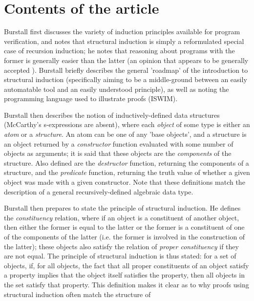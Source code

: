 \documentclass[11pt]{article}
\begin{document}
\iffalse
difference to mccarthy/painter version?
read notes
\fi

\section{Contents of the article}

Burstall first discusses the variety of induction principles available for
program verification, and notes that structural induction is simply a
reformulated special case of recursion induction; he notes that reasoning about
programs with the former is generally easier than the latter (an opinion that
appears to be generally accepted \cite{brady1977hints}). Burstall briefly
describes the general 'roadmap' of the introduction to structural induction
(specifically aiming to be a middle-ground between an easily automatable
tool and an easily understood principle), as well as noting the programming
language used to illustrate proofs (ISWIM). 
\par
Burstall then describes the notion of inductively-defined data structures
(McCarthy's s-expressions are absent), where each \textit{object} of some type is
either an \textit{atom} or a \textit{structure}. An atom can be one of any 'base
objects', and a structure is an object returned by a \textit{constructor}
function evaluated with some number of objects as arguments; it is said that
these objects are the \textit{components} of the structure. Also defined are the
\textit{destructor} function, returning the components of a structure, and the
\textit{predicate} function, returning the truth value of whether a given object
was made with a given constructor. Note that these definitions match the
description of a general recursively-defined algebraic data type.
\par
Burstall then prepares to state the principle of structural induction. He
defines the \textit{constituency} relation,  where if an object is a constituent
of another object, then either the former is equal to the latter or the former
is a constituent of one of the components of the latter (i.e. the former is
involved in the construction of the latter); these objects also satisfy the
relation of \textit{proper constituency} if they are not equal. The principle of
structural induction is thus stated: for a set of objects, if, for all
objects, the fact that all proper constituents of an object satisfy a
property implies that the object itself satisfies the property, then all
objects in the set satisfy that property. This definition makes it
clear as to why proofs using structural induction often match the structure of
\end{document}
